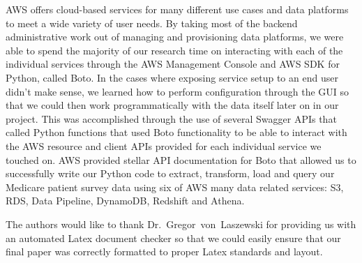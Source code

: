AWS offers cloud-based services for many different use cases and data 
platforms to meet a wide variety of user needs. By taking most of the backend 
administrative work out of managing and provisioning data platforms, we were 
able to spend the majority of our research time on interacting with each of 
the individual services through the AWS Management Console and AWS SDK for 
Python, called Boto. In the cases where exposing service setup to an end user 
didn't make sense, we learned how to perform configuration through the GUI so 
that we could then work programmatically with the data itself later on in our 
project. This was accomplished through the use of several Swagger APIs that 
called Python functions that used Boto functionality to be able to interact 
with the AWS resource and client APIs provided for each individual service we 
touched on. AWS provided stellar API documentation for Boto that allowed us to 
successfully write our Python code to extract, transform, load and query our 
Medicare patient survey data using six of AWS many data related services: S3, 
RDS, Data Pipeline, DynamoDB, Redshift and Athena.    

\begin{acks}
The authors would like to thank Dr.~Gregor~von~Laszewski for providing us
with an automated Latex document checker so that we could easily ensure
that our final paper was correctly formatted to proper Latex standards and 
layout.
\end{acks}


 


